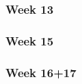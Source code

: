    \subsubsection{Week 13}
    
    
    \subsubsection{Week 15}
    
    
    \subsubsection{Week 16+17}
    
